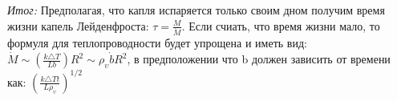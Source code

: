 \begin{frame}{}
\begin{block}{\sl Итог:}
Предполагая, что капля испаряется только своим дном получим время жизни капель Лейденфроста: \(\tau=\frac{M}{\dot{M}}\). Если счиать, что время жизни мало, то формуля для теплопроводности будет упрощена и иметь вид: \( \dot{M} \sim \left(\frac{k \triangle T}{Lb}\right)R^{2} \sim \rho_{\upsilon}\dot{b}R^{2}\), в предположении что b должен зависить от времени как: \(\left(\frac{k\triangle Tt}{L\rho_{\upsilon}}\right)^{1/2}\)
\end{block}
\end{frame}

